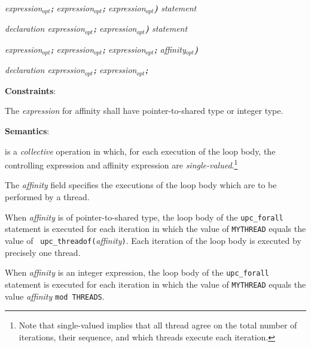\hspace{3em}{\bf for (} {\em expression$_{opt}${\bf ;} 
                         expression$_{opt}${\bf ;}
expression$_{opt}${\bf )} statement}

\hspace{3em}{\bf for (} {\em declaration expression$_{opt}${\bf ;} 
                         expression$_{opt}${\bf )} statement}

\hspace{3em}{\bf upc\_forall (} {\em expression$_{opt}${\bf ;} 
expression$_{opt}${\bf ;}
expression$_{opt}${\bf ;}
affinity$_{opt}${\bf )}}

\hspace{3em}{\bf upc\_forall (} {\em declaration expression$_{opt}${\bf ;} 
expression$_{opt}${\bf ;}}\\
                            


\hspace{3em}{\em expression}

\hspace{3em}{\bf continue }

{\bf Constraints}: 

\np The {\em expression} for affinity shall have pointer-to-shared
    type or integer type.

{\bf Semantics}: 

 is a {\em collective} operation in which, for each
    execution of the loop body, the controlling expression and
    affinity expression are {\em single-valued}.\footnote{Note that
    single-valued implies that all thread agree on the total number
    of iterations, their sequence, and which threads execute each
    iteration.}

\np The {\em affinity} field specifies the executions of the loop
    body which are to be performed by a thread.
    
\np When {\em affinity} is of pointer-to-shared type, the loop body of
    the {\tt upc\_forall} statement is executed for each iteration in
    which the value of {\tt MYTHREAD} equals the value of {\tt
    upc\_threadof(}{\em affinity}{\tt )}.  Each iteration of the  loop body is executed by
    precisely one thread.

\np When {\em affinity} is an integer expression, the loop body of
    the {\tt upc\_forall} statement is executed for each iteration in which
    the value of {\tt MYTHREAD} equals the value {\em affinity }{\tt mod THREADS}.

